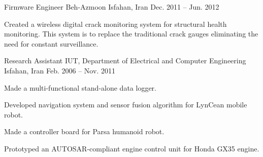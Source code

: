 \begin{cventries}
{\begin{cvitems}
      \end{cvitems}
    }
  \cventry
    {Firmware Engineer}
    {Beh-Azmoon}
    {Isfahan, Iran}
    {Dec. 2011 -- Jun. 2012}
    {
      \begin{cvitems}
        \item Created a wireless digital crack monitoring system for structural health monitoring. This system is to replace the traditional crack gauges eliminating the need for constant surveillance.
      \end{cvitems}
    }
  \cventry
    {Research Assistant}
    {IUT, Department of Electrical and Computer Engineering}
    {Isfahan, Iran}
    {Feb. 2006 -- Nov. 2011}
    {
      \begin{cvitems}
        \item Made a multi-functional stand-alone data logger.
        \item Developed navigation system and sensor fusion algorithm for LynCean mobile robot.
        \item Made a controller board for Parsa humanoid robot.
        \item Prototyped an AUTOSAR-compliant engine control unit for Honda GX35 engine.
      \end{cvitems}
    }
\end{cventries} 